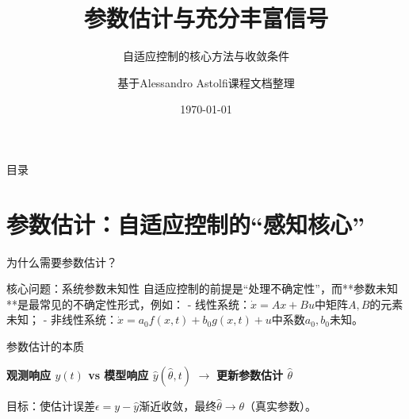 \documentclass{beamer}
\title{参数估计与充分丰富信号}
\subtitle{自适应控制的核心方法与收敛条件}
\author{基于Alessandro Astolfi课程文档整理}
\institute{自动化学院 控制理论与应用教研室}
\date{\today}
\begin{document}
\begin{frame}
  \titlepage
\end{frame}

\begin{frame}{目录}
  \tableofcontents[sectionstyle=show/shaded, subsectionstyle=show/show/shaded]
\end{frame}

\section{参数估计：自适应控制的“感知核心”}
\begin{frame}{为什么需要参数估计？}
  \begin{block}{核心问题：系统参数未知性}
    自适应控制的前提是“处理不确定性”，而**参数未知**是最常见的不确定性形式，例如：
    - 线性系统：$\dot{x}=Ax+Bu$中矩阵$A,B$的元素未知；
    - 非线性系统：$\dot{x}=a_0f(x,t)+b_0g(x,t)+u$中系数$a_0,b_0$未知。
  \end{block}

  \vspace{0.5cm}
  \begin{block}{参数估计的本质}
    \begin{center}
      \textbf{观测响应 $y(t)$ vs 模型响应 $\hat{y}(\hat{\theta},t)$} $\to$ \textbf{更新参数估计 $\hat{\theta}$}
    \end{center}
    目标：使估计误差$\epsilon=y-\hat{y}$渐近收敛，最终$\hat{\theta}\to\theta$（真实参数）。
  \end{block}
\end{frame}
\end{document}
